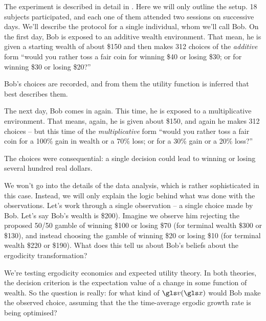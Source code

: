 The experiment is described in detail in \cite{MederETAL2019}. Here we will only outline the setup. 
18 subjects participated, and each one of them attended two sessions on successive days.
We'll describe the protocol for a single individual, whom we'll call Bob. On the first day, Bob 
is exposed to an additive wealth environment. That mean, he is given a starting wealth of 
about \$150 and then makes 312 choices of the {\it additive} form ``would you rather toss a fair 
coin for winning \$40 or losing \$30; or for winning \$30 or losing \$20?'' 

Bob's choices are recorded, and from them the utility function is inferred that best describes them. 

The next day, Bob comes in again. This time, he is exposed to a multiplicative environment. That means, again, 
he is given about \$150, and again he makes 
312 choices -- but this time of the {\it multiplicative} form ``would you rather toss a fair coin for a 
100\% gain in wealth or a 70\% loss; or for a 30\% gain or a 20\% loss?''

The choices were consequential: a single decision could lead to winning or losing several 
hundred real dollars. 

We won't go into the details of the data analysis, which is rather sophisticated in this case. Instead, 
we will only explain the logic behind what was done with the observations. 
Let's work through a single observation -- a single choice made by Bob. 
Let's say Bob's wealth is \$200). Imagine we observe him rejecting
the proposed 50/50 gamble of winning \$100 or losing \$70 (for terminal wealth \$300 or \$130), 
and instead choosing the gamble of winning \$20 or losing \$10 (for terminal  wealth \$220 or \$190). 
What does this tell us about Bob's beliefs about the ergodicity transformation?

We're testing ergodicity economics and expected utility theory. In both theories, the decision criterion
is the expectation value of a change in some function of wealth. So the question is really:
for what kind of $\gv(\x)$ would Bob make the observed choice, assuming that the
the time-average ergodic growth rate is being optimised?

